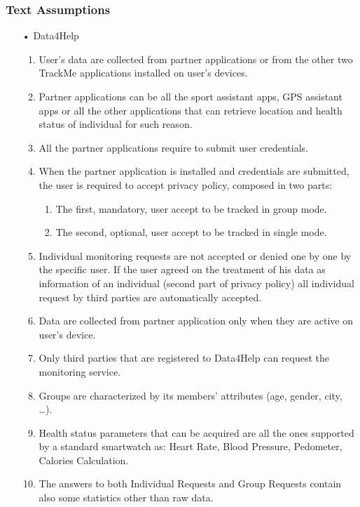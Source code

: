 \subsubsection{Text Assumptions}
\begin{enumerate}

\item[•] {\Large Data4Help}
	\begin{enumerate}
	\item User's data are collected from partner applications or from the other two TrackMe applications installed on user's devices.
	\item Partner applications can be all the sport assistant apps, GPS assistant apps or all the other applications that can retrieve location and health status of individual for such reason.
	\item All the partner applications require to submit user credentials. 
	\item When the partner application is installed and credentials are submitted,
	the user is required to accept privacy policy, composed in two parts:
		\begin{enumerate}
		\item The first, mandatory, user accept to be tracked in group mode.
		\item The second, optional, user accept to be tracked in single mode.
		\end{enumerate}
	\item Individual monitoring requests are not accepted or denied one by one by the specific user. If the user agreed on the treatment of his data as information of an individual (second part of privacy policy) all individual request by third parties are automatically accepted.	
	\item Data are collected from partner application only when they are active on user's device.
	\item Only third parties that are registered to Data4Help can request the monitoring service.
	\item Groups are characterized by its members' attributes (age, gender, city, …).
	\item Health status parameters that can be acquired are all the ones supported by a standard smartwatch as: Heart Rate, Blood Pressure, Pedometer, Calories Calculation.
	\item The answers to both Individual Requests and Group Requests contain also some statistics other than raw data.
	\end{enumerate}
	

\end{enumerate}
